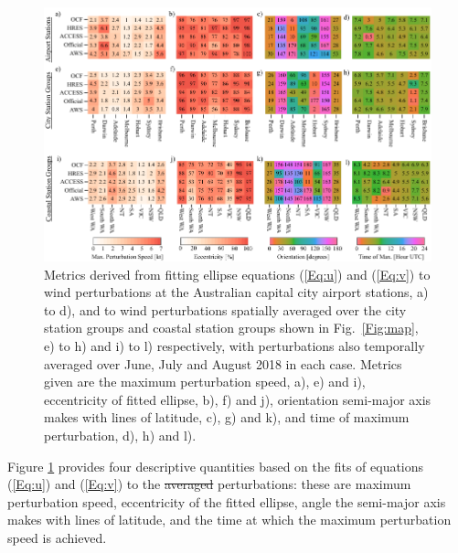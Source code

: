 \documentclass{ametsoc}
\providecommand{\DIFadd}[1]{{\protect\color{blue}\uwave{#1}}} %
\providecommand{\DIFdel}[1]{{\protect\color{red}\sout{#1}}}                      %
\providecommand{\DIFaddbegin}{} %
\providecommand{\DIFaddend}{} %
\providecommand{\DIFdelbegin}{} %
\providecommand{\DIFdelend}{} %
\providecommand{\DIFaddbeginFL}{} %
\providecommand{\DIFaddendFL}{} %
\providecommand{\DIFdelbeginFL}{} %
\providecommand{\DIFdelendFL}{} %
\begin{document}
\begin{figure}
\centering
\DIFdelbeginFL %
\DIFdelendFL \DIFaddbeginFL \includegraphics[width=39pc]{ellipse_fits.pdf}
\DIFaddendFL \caption{Metrics derived from fitting ellipse equations (\ref{Eq:u}) and (\ref{Eq:v}) to wind perturbations at the Australian capital city airport stations, a) to d), and to wind perturbations spatially averaged over the city station groups and coastal station groups shown in Fig.~\ref{Fig:map}, e) to h) and i) to l) respectively, with perturbations also temporally averaged over June, July and August 2018 in each case. Metrics given are the maximum perturbation speed, a), e) and i), eccentricity of fitted ellipse, b), f) and j), orientation semi-major axis makes with lines of latitude, c), g) and k), and time of maximum perturbation, d), h) and l).}
\label{Fig:ellipse_fits}
\end{figure}

Figure \ref{Fig:ellipse_fits} provides four descriptive quantities based on the fits of equations (\ref{Eq:u}) and (\ref{Eq:v}) to the \DIFdelbegin \DIFdel{averaged }\DIFdelend \DIFaddbegin \DIFadd{mean }\DIFaddend perturbations: these are maximum perturbation speed, eccentricity of the fitted ellipse, angle the semi-major axis makes with lines of latitude, and the time at which the maximum perturbation speed is achieved. 
\DIFaddbegin 
\end{document}
